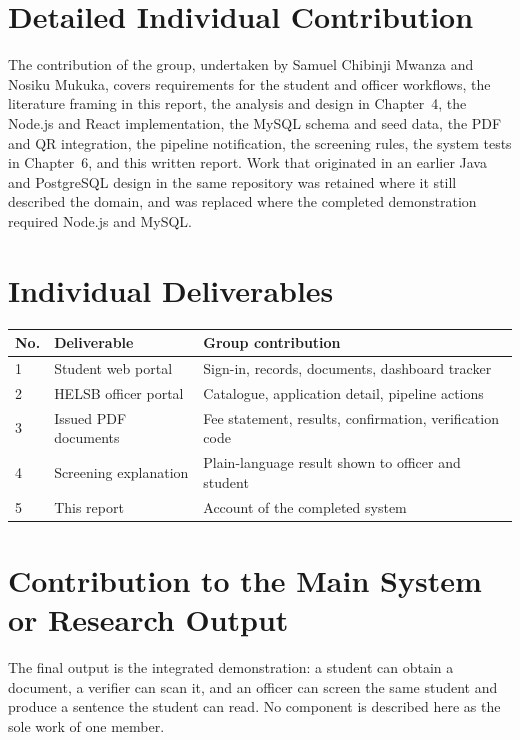 \documentclass[12pt,a4paper]{report}
\begin{document}
\section{Detailed Individual Contribution}
The contribution of the group, undertaken by Samuel Chibinji Mwanza and Nosiku Mukuka, covers requirements for the student and officer workflows, the literature framing in this report, the analysis and design in Chapter~4, the Node.js and React implementation, the MySQL schema and seed data, the PDF and QR integration, the pipeline notification, the screening rules, the system tests in Chapter~6, and this written report. Work that originated in an earlier Java and PostgreSQL design in the same repository was retained where it still described the domain, and was replaced where the completed demonstration required Node.js and MySQL.

\section{Individual Deliverables}

\begin{table}[H]
\centering
\begin{tabular}{p{}p{}p{}}
\toprule
\textbf{No.} & \textbf{Deliverable} & \textbf{Group contribution} \\
\midrule
1 & Student web portal & Sign-in, records, documents, dashboard tracker \\
2 & HELSB officer portal & Catalogue, application detail, pipeline actions \\
3 & Issued PDF documents & Fee statement, results, confirmation, verification code \\
4 & Screening explanation & Plain-language result shown to officer and student \\
5 & This report & Account of the completed system \\
\bottomrule
\end{tabular}
\end{table}

\section{Contribution to the Main System or Research Output}
The final output is the integrated demonstration: a student can obtain a document, a verifier can scan it, and an officer can screen the same student and produce a sentence the student can read. No component is described here as the sole work of one member.
\end{document}
